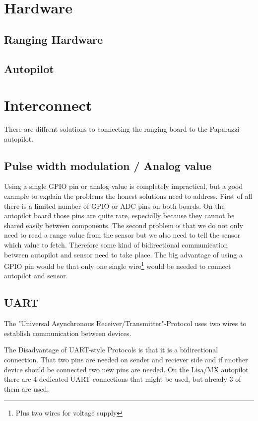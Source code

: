 
\section{Hardware}

\subsection{Ranging Hardware}

\subsection{Autopilot}

\section{Interconnect}
There are diffrent solutions to connecting the ranging board to the Paparazzi autopilot.

\subsection{Pulse width modulation / Analog value}
Using a single GPIO pin or analog value is completely impractical, but a good example to explain the problems the honest solutions need to address.
First of all there is a limited number of GPIO or ADC-pins on both boards.
On the autopilot board those pins are quite rare, especially because they cannot be shared easily between components.
The second problem is that we do not only need to read a range value from the sensor but we also need to tell the sensor which value to fetch.
Therefore some kind of bidirectional communication between autopilot and sensor need to take place.
The big advantage of using a GPIO pin would be that only one single wire\footnote{Plus two wires for voltage supply} would be needed to connect autopilot and sensor.

\subsection{UART}
The "Universal Asynchronous Receiver/Transmitter"-Protocol uses two wires to establish communication between devices.
\cite{wingen_automatic_2004}

The Disadvantage of UART-style Protocols is that it is a bidirectional connection.
That two pins are needed on sender and reciever side and if another device should be connected two new pins are needed.
On the Lisa/MX autopilot there are 4 dedicated UART connections that might be used, but already 3 of them are used.

